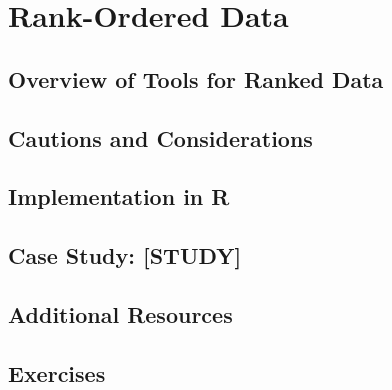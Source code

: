 
\chapter{Rank-Ordered Data}

\section{Overview of Tools for Ranked Data}

\section{Cautions and Considerations}

\section{Implementation in R}

\section{Case Study: [STUDY]}

\section{Additional Resources}

\section{Exercises}